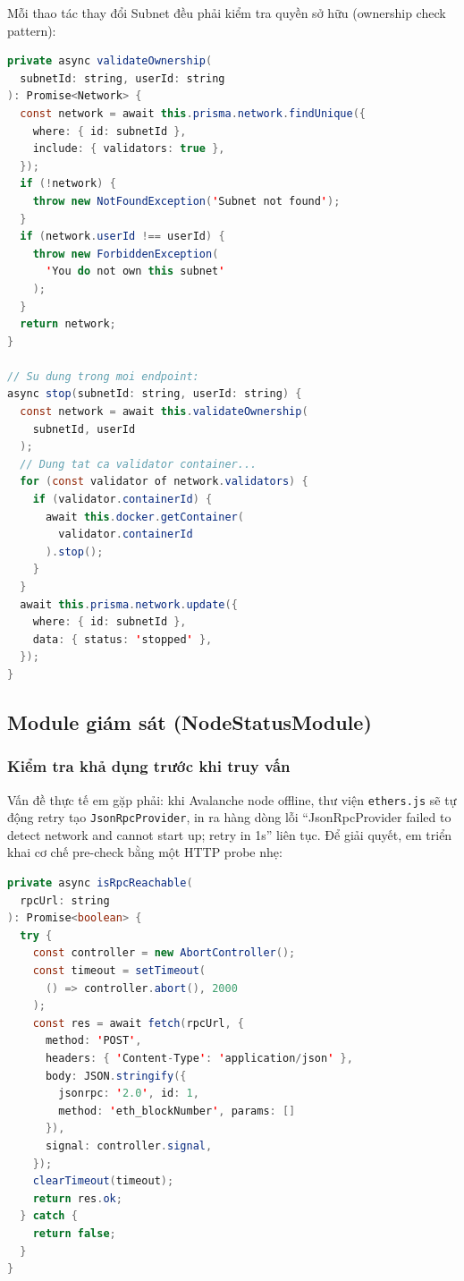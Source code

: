 Mỗi thao tác thay đổi Subnet đều phải kiểm tra quyền sở hữu (ownership check pattern):

\begin{lstlisting}[caption={Pattern kiểm tra quyền sở hữu Subnet}, label={lst:ownership}, language=Java]
private async validateOwnership(
  subnetId: string, userId: string
): Promise<Network> {
  const network = await this.prisma.network.findUnique({
    where: { id: subnetId },
    include: { validators: true },
  });
  if (!network) {
    throw new NotFoundException('Subnet not found');
  }
  if (network.userId !== userId) {
    throw new ForbiddenException(
      'You do not own this subnet'
    );
  }
  return network;
}

// Su dung trong moi endpoint:
async stop(subnetId: string, userId: string) {
  const network = await this.validateOwnership(
    subnetId, userId
  );
  // Dung tat ca validator container...
  for (const validator of network.validators) {
    if (validator.containerId) {
      await this.docker.getContainer(
        validator.containerId
      ).stop();
    }
  }
  await this.prisma.network.update({
    where: { id: subnetId },
    data: { status: 'stopped' },
  });
}
\end{lstlisting}


\subsection{Module giám sát (NodeStatusModule)}

\subsubsection{Kiểm tra khả dụng trước khi truy vấn}

Vấn đề thực tế em gặp phải: khi Avalanche node offline, thư viện \texttt{ethers.js} sẽ tự động retry tạo \texttt{JsonRpcProvider}, in ra hàng dòng lỗi ``JsonRpcProvider failed to detect network and cannot start up; retry in 1s'' liên tục. Để giải quyết, em triển khai cơ chế pre-check bằng một HTTP probe nhẹ:

\begin{lstlisting}[caption={isRpcReachable --- Kiểm tra khả dụng trước khi tạo Provider}, label={lst:rpc_precheck}, language=Java]
private async isRpcReachable(
  rpcUrl: string
): Promise<boolean> {
  try {
    const controller = new AbortController();
    const timeout = setTimeout(
      () => controller.abort(), 2000
    );
    const res = await fetch(rpcUrl, {
      method: 'POST',
      headers: { 'Content-Type': 'application/json' },
      body: JSON.stringify({
        jsonrpc: '2.0', id: 1,
        method: 'eth_blockNumber', params: []
      }),
      signal: controller.signal,
    });
    clearTimeout(timeout);
    return res.ok;
  } catch {
    return false;
  }
}
\end{lstlisting}

